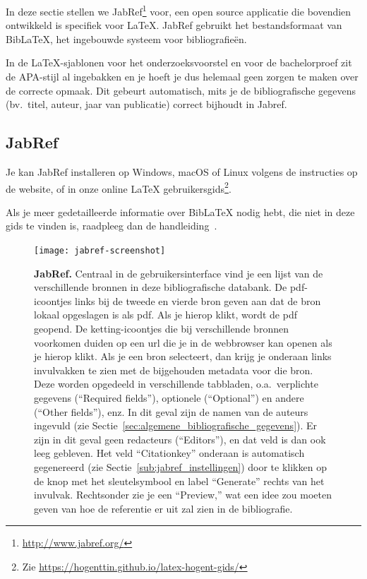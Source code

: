 In deze sectie stellen we JabRef\footnote{\url{http://www.jabref.org/}} voor, een open source applicatie die bovendien ontwikkeld is specifiek voor {\LaTeX}. JabRef gebruikt het bestandsformaat van Bib{\LaTeX}, het ingebouwde systeem voor bibliografieën.

In de {\LaTeX}-sjablonen voor het onderzoeksvoorstel en voor de bachelorproef zit de APA-stijl al ingebakken en je hoeft je dus helemaal geen zorgen te maken over de correcte opmaak. Dit gebeurt automatisch, mits je de bibliografische gegevens (bv.\ titel, auteur, jaar van publicatie) correct bijhoudt in Jabref.

\subsection{JabRef}%
\label{ssec:jabref}

Je kan JabRef installeren op Windows, macOS of Linux volgens de instructies op de website, of in onze online {\LaTeX} gebruikersgids\footnote{Zie \url{https://hogenttin.github.io/latex-hogent-gids/}}.

Als je meer gedetailleerde informatie over Bib{\LaTeX} nodig hebt, die niet in deze gids te vinden is, raadpleeg dan de handleiding~\autocite{LehmanEtAl2016}.

\begin{figure}
  \centering
  \texttt{[image: jabref-screenshot]}
  \caption[JabRef]{\label{fig:jabref}\textbf{JabRef.} Centraal in de gebruikersinterface vind je een lijst van de verschillende bronnen in deze bibliografische databank. De pdf-icoontjes links bij de tweede en vierde bron geven aan dat de bron lokaal opgeslagen is als pdf. Als je hierop klikt, wordt de pdf geopend. De ketting-icoontjes die bij verschillende bronnen voorkomen duiden op een url die je in de webbrowser kan openen als je hierop klikt. Als je een bron selecteert, dan krijg je onderaan links invulvakken te zien met de bijgehouden metadata voor die bron. Deze worden opgedeeld in verschillende tabbladen, o.a.~verplichte gegevens (``Required fields''), optionele (``Optional'') en andere (``Other fields''), enz. In dit geval zijn de namen van de auteurs ingevuld (zie Sectie~\ref{sec:algemene_bibliografische_gegevens}). Er zijn in dit geval geen redacteurs (``Editors''), en dat veld is dan ook leeg gebleven. Het veld ``Citationkey'' onderaan is automatisch gegenereerd (zie Sectie~\ref{sub:jabref_instellingen}) door te klikken op de knop met het sleutelsymbool en label ``Generate'' rechts van het invulvak. Rechtsonder zie je een ``Preview,'' wat een idee zou moeten geven van hoe de referentie er uit zal zien in de bibliografie.}

\end{figure}

